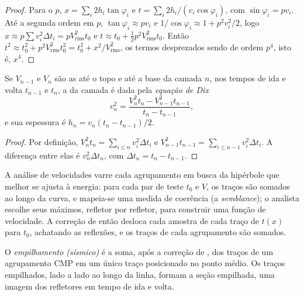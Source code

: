 \begin{proof}
Para o  $p$, $x = \sum_i 2h_i\tan\varphi_i$ e
$t = \sum_i 2h_i/(v_i\cos\varphi_i)$, com $\sin\varphi_i = pv_i$. Até a segunda
ordem em $p$, $\tan\varphi_i \approx pv_i$ e $1/\cos\varphi_i \approx 1 +
p^2v_i^2/2$, logo $x \approx p\sum v_i^2\Delta t_i = pV_{\text{rms}}^2t_0$ e
$t \approx t_0 + \tfrac12p^2V_{\text{rms}}^2t_0$. Então
$t^2 \approx t_0^2 + p^2V_{\text{rms}}^2t_0^2 = t_0^2 + x^2/V_{\text{rms}}^2$, os
termos desprezados sendo de ordem $p^4$, isto é, $x^4$.
\end{proof}

\begin{theorem}\label{thm:b3:exploration-seismology:dix}
Se $V_{n-1}$ e $V_n$ são as  até o topo e até a base da camada
$n$, nos tempos de ida e volta $t_{n-1}$ e $t_n$, a  da
camada é dada pela \emph{equação de Dix}
\[
  v_n^2 = \frac{V_n^2t_n - V_{n-1}^2t_{n-1}}{t_n - t_{n-1}} ,
\]
e sua espessura é $h_n = v_n(t_n - t_{n-1})/2$.
\end{theorem}

\begin{proof}
Por definição, $V_n^2t_n = \sum_{i\le n}v_i^2\Delta t_i$ e $V_{n-1}^2t_{n-1}
= \sum_{i\le n-1}v_i^2\Delta t_i$. A diferença entre elas é $v_n^2\Delta t_n$, com
$\Delta t_n = t_n - t_{n-1}$.
\end{proof}

A análise de velocidades varre cada agrupamento em busca da hipérbole que melhor se ajusta à
energia: para cada par de teste $t_0$ e $V$, os traços são somados ao longo da curva, e
mapeia-se uma medida de coerência (a \textit{semblance}); o analista escolhe seus máximos,
refletor por refletor, para construir uma função de velocidade. A correção de  então
desloca cada amostra de cada traço de $t(x)$ para $t_0$, achatando as
reflexões, e os traços de cada agrupamento são somados.

\begin{definition}\label{def:b3:exploration-seismology:stack}
O \emph{empilhamento (sísmico)} é a soma, após a
correção de , dos traços de um agrupamento CMP em um único traço
posicionado no ponto médio. Os traços empilhados, lado a lado ao longo da linha, formam
a seção empilhada, uma imagem dos refletores em tempo de ida e volta.
\end{definition}

